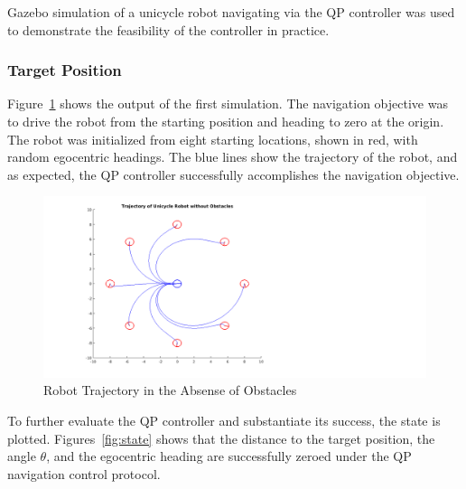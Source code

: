 \documentclass[journal]{IEEEtran}
\begin{document}
Gazebo simulation of a unicycle robot navigating via the QP controller was used to demonstrate the feasibility of the controller in practice.
\subsubsection{Target Position}
Figure~\ref{fig:octoplotsans} shows the output of the first simulation. The navigation objective was to drive the robot from the starting position and heading to zero at the origin. The robot was initialized from eight starting locations, shown in red, with random egocentric headings. The blue lines show the trajectory of the robot, and as expected, the QP controller successfully accomplishes the navigation objective.

\begin{figure}[h!]
\centering
\includegraphics[scale=0.4]{octoPlotCrisisSQR.png} 
\caption{Robot Trajectory in the Absense of Obstacles\label{fig:octoplotsans}} 
\end{figure}

To further evaluate the QP controller and substantiate its success, the state is plotted. Figures~\ref{fig:state} shows that the distance to the target position, the angle $\theta$, and the egocentric heading are successfully zeroed under the QP navigation control protocol.
\end{document}
